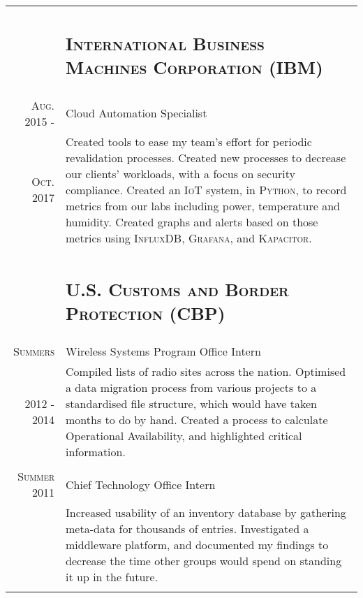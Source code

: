 \documentclass[letterpaper,10pt]{article}
\begin{document}
\begin{tabular}{R|p{6.2in}}
	                               & \subsection{\textsc{International Business Machines Corporation (IBM)}}                         \\

	\textsc{Aug.} 2015 -           & Cloud Automation Specialist                                                                     \\
	\textsc{Oct.} 2017\phantom{ -} & \footnotesize Created tools to ease my team's effort for periodic revalidation processes.
	Created new processes to decrease our clients' workloads, with a focus on security compliance. Created an \textsc{IoT} system,
	in \textsc{Python}, to record metrics from our labs including power, temperature and humidity. Created graphs and alerts based
	on those metrics using \textsc{InfluxDB}, \textsc{Grafana}, and \textsc{Kapacitor}.                                              \\
	                                                                                                             \\

	                               & \subsection{\textsc{U.S. Customs and Border Protection (CBP)}}                                  \\

	\textsc{Summers}               & Wireless Systems Program Office Intern                                                          \\
	2012 - 2014                    & \footnotesize Compiled lists of radio sites across the nation. Optimised a data migration
	process from various projects to a standardised file structure, which would have taken months to do by hand. Created a process
	to calculate Operational Availability, and highlighted critical information.                                                     \\\\

	\textsc{Summer} 2011           & Chief Technology Office Intern                                                                  \\
	                               & \footnotesize Increased usability of an inventory database by gathering meta-data for thousands
	of entries. Investigated a middleware platform, and documented my findings to decrease the time
	other groups would spend on standing it up in the future.                                                                        \\\\


\end{tabular}
\end{document}
